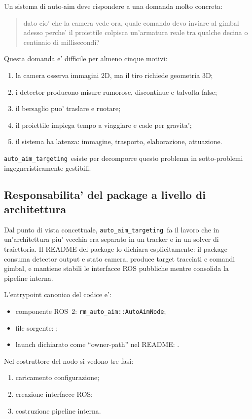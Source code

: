 \documentclass[11pt,a4paper]{article}
\newcommand{\pkg}{\texttt{auto\_aim\_targeting}}
\newcommand{\code}[1]{\texttt{#1}}
\begin{document}
Un sistema di auto-aim deve rispondere a una domanda molto concreta:
\begin{quote}
  dato cio' che la camera vede ora, quale comando devo inviare al gimbal adesso perche' il proiettile colpisca un'armatura reale tra qualche decina o centinaio di millisecondi?
\end{quote}

Questa domanda e' difficile per almeno cinque motivi:
\begin{enumerate}[leftmargin=1.4em]
  \item la camera osserva immagini 2D, ma il tiro richiede geometria 3D;
  \item i detector producono misure rumorose, discontinue e talvolta false;
  \item il bersaglio puo' traslare e ruotare;
  \item il proiettile impiega tempo a viaggiare e cade per gravita';
  \item il sistema ha latenza: immagine, trasporto, elaborazione, attuazione.
\end{enumerate}

\pkg\ esiste per decomporre questo problema in sotto-problemi ingegneristicamente gestibili.

\subsection{Responsabilita' del package a livello di architettura}

Dal punto di vista concettuale, \pkg\ fa il lavoro che in un'architettura piu' vecchia era separato in un tracker e in un solver di traiettoria. Il README del package lo dichiara esplicitamente: il package consuma detector output e stato camera, produce target tracciati e comandi gimbal, e mantiene stabili le interfacce ROS pubbliche mentre consolida la pipeline interna.

L'entrypoint canonico del codice e':
\begin{itemize}[leftmargin=1.4em]
  \item componente ROS~2: \code{rm\_auto\_aim::AutoAimNode};
  \item file sorgente: ;
  \item launch dichiarato come ``owner-path'' nel README: .
\end{itemize}

Nel costruttore del nodo si vedono tre fasi:
\begin{enumerate}[leftmargin=1.4em]
  \item caricamento configurazione;
  \item creazione interfacce ROS;
  \item costruzione pipeline interna.
\end{enumerate}
\end{document}
